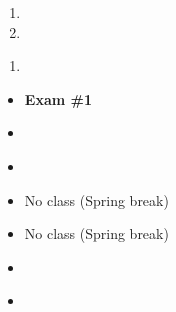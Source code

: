 \documentclass{article}
\begin{document}
%

\dia{}
\begin{enumerate}
\item {}
\item {}
\end{enumerate}

\dia{}
\begin{enumerate}
\item {}
\end{enumerate}

\week{}
\dia{}
\Review{}
\dia{}
\begin{itemize}
\item[ ] \textbf{Exam \#1}
\end{itemize}



\week{}
\dia{}
\begin{itemize}
\item {}
\end{itemize}

\dia{}
\begin{itemize}
\item {}
\end{itemize}

\week{}
\dia{}
\begin{itemize}
\item[ ] No class (Spring break)
\end{itemize}
\dia{}
\begin{itemize}
\item[ ] No class (Spring break)
\end{itemize}

\dia{}
\begin{itemize}
\item {}
\end{itemize}

\dia{}
\begin{itemize}
\item {}
\end{itemize}
\end{document}
